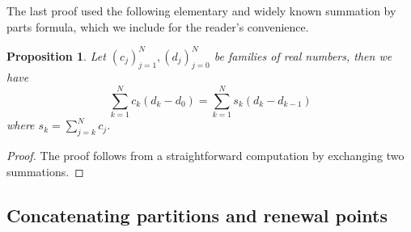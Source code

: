 \documentclass[letterpaper, DIV=17]{scrartcl}
\newtheorem{prop}[theorem]{Proposition}
\numberwithin{equation}{section}
\theoremstyle{definition}
\begin{document}
		The last proof used the following elementary and widely known summation by parts formula, which we include for the reader's convenience.
		\begin{prop}
			Let $(c_j)_{j=1}^N, (d_j)_{j=0}^N$ be families of real numbers, then we have
			\begin{equation} \label{integration by parts}
				\sum_{k=1}^N c_k (d_k-d_0) = \sum_{k=1}^N s_k (d_k-d_{k-1})
			\end{equation}
			where $s_k=\sum_{j=k}^N c_j$.
		\end{prop}
		\begin{proof}
			The proof follows from a straightforward computation by exchanging two summations.

		\end{proof}


\subsection{Concatenating partitions and renewal points}
\end{document}
